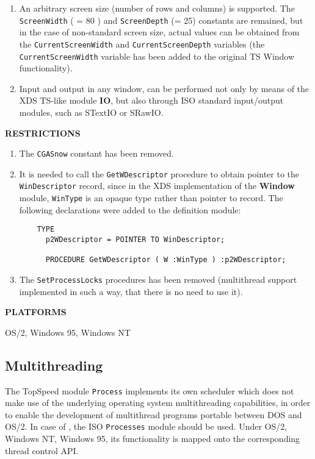 \begin{enumerate}
\item An arbitrary screen size (number of rows and columns) is supported.
      The \verb'ScreenWidth' ( = 80 ) and \verb'ScreenDepth' (= 25) constants are
      remained, but in the case of non-standard screen size,
      actual values can be obtained from the \verb'CurrentScreenWidth' and
      \verb'CurrentScreenDepth' variables (the \verb'CurrentScreenWidth' variable has
      been added to the original TS Window functionality).

\item Input and output in any window, can be performed not only by means
      of the XDS TS-like module {\bf IO}, but also through ISO standard
      input/output modules, such as STextIO or SRawIO.
\end{enumerate}

{\bf RESTRICTIONS}

\begin{enumerate}
\item The \verb'CGASnow' constant has been removed.

\item It is needed to call the \verb'GetWDescriptor' procedure to obtain
      pointer to the \verb'WinDescriptor' record, since in the XDS
      implementation of the {\bf Window} module,  \verb'WinType' is an opaque type
      rather than pointer to record. The following declarations were
      added to the definition module:

\begin{verbatim}
    TYPE
      p2WDescriptor = POINTER TO WinDescriptor;

      PROCEDURE GetWDescriptor ( W :WinType ) :p2WDescriptor;
\end{verbatim}

\item The \verb'SetProcessLocks' procedures has been removed (multithread
      support implemented in such a way, that there is no need to use it).
\end{enumerate}

{\bf PLATFORMS}

  OS/2, Windows 95, Windows NT

\subsection{Multithreading}
\label{mt}

    The TopSpeed module \verb'Process' implements its own scheduler which does
    not make use of the underlying operating system multithreading capabilities,
    in order to enable the development of multithread programs portable between
    DOS and OS/2. In case of \xds{}, the ISO \verb'Processes' module should be used.
    Under OS/2, Windows NT, Windows 95, its functionality is mapped onto
    the corresponding thread control API.

